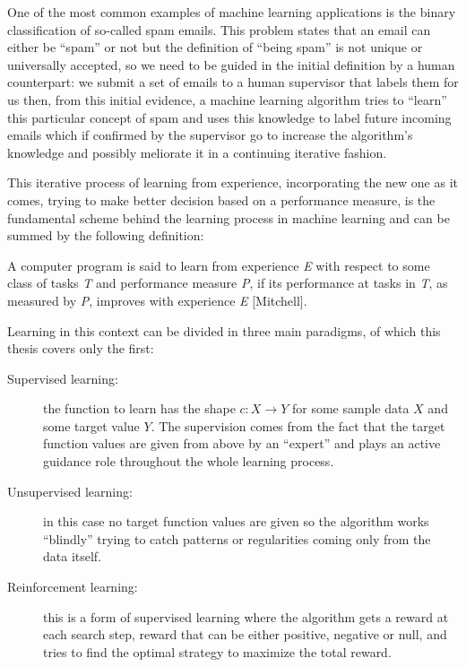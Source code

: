 One of the most common examples of machine learning applications is the binary
classification of so-called spam emails.
This problem states that an email can either be ``spam'' or not but the definition
of ``being spam'' is not unique or universally accepted, so we need to be guided
in the initial definition by a human counterpart: we submit a set of emails to a
human supervisor that labels them for us then, from this initial evidence, a
machine learning algorithm tries to ``learn'' this particular concept of spam
and uses this knowledge to label future incoming emails which if confirmed by the
supervisor go to increase the algorithm's knowledge and possibly meliorate it in
a continuing iterative fashion.

This iterative process of learning from experience, incorporating the new one
as it comes, trying to make better decision based on a performance measure, is
the fundamental scheme behind the learning process in machine learning and can
be summed by the following definition:

\begin{definition}[Learning]
    A computer program is said to learn from experience \emph{E} with
    respect to some class of tasks \emph{T} and performance measure \emph{P},
    if its performance at tasks in \emph{T}, as measured by \emph{P}, improves
    with experience \emph{E} [Mitchell].
\end{definition}

Learning in this context can be divided in three main paradigms, of which this
thesis covers only the first:
\begin{description}
    \item [Supervised learning:] the function to learn has the shape
    $c: X \to Y$ for some sample data $X$ and some target value $Y$.
    The supervision comes from the fact that the target function values are
    given from above by an ``expert'' and plays an active guidance role throughout
    the whole learning process.
    \item [Unsupervised learning:] in this case no target function values are
        given so the algorithm works ``blindly'' trying to catch patterns or
        regularities coming only from the data itself.
    \item [Reinforcement learning:] this is a form of supervised learning
        where the algorithm gets a reward at each search step, reward that can
        be either positive, negative or null, and tries to find the optimal
        strategy to maximize the total reward.
\end{description}

